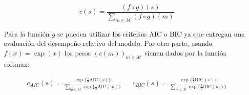 \begin{equation}
c(s) = \frac{(f\circ g)(s)}{\sum_{m\in \mathcal{M}} (f\circ g)(m)}
\end{equation}

Para la función $g$ se pueden utilizar los criterios AIC o BIC ya que entregan una evaluación del desempeño relativo del modelo. Por otra parte, usando $f(x)=\exp(x)$ los pesos $\left(c(m)\right)_{m\in\mathcal{M}}$ vienen dados por la función softmax:



\begin{align}
c_{AIC}(s) = \frac{\exp\{ \frac{1}{2} \text{AIC}(s)\}}{\sum_{m\in \mathcal{M}} \exp\{ \frac{1}{2} \text{AIC}(m)\}} & & c_{BIC}(s) = \frac{\exp\{ \frac{1}{2} \text{BIC}(s)\}}{\sum_{m\in \mathcal{M}} \exp\{ \frac{1}{2} \text{BIC}(m)\}}
\end{align}
